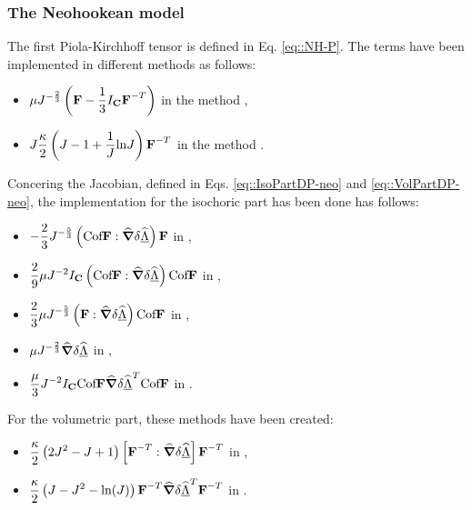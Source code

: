 \subsubsection{The Neohookean model}
The first Piola-Kirchhoff tensor is defined in Eq. \eqref{eq::NH-P}. The terms have been implemented in different methods as follows:
\begin{itemize}
  \item $\displaystyle \mu J^{-\frac{2}{3}}\left(\textbf{F}-\frac{1}{3}I_{\textbf{C}}\textbf{F}^{-T}\right)$ in the method ,
  \item $\displaystyle J\frac{\kappa}{2}\left(J-1+\frac{1}{J}\text{ln}J\right)\textbf{F}^{-T}$ in the method .
\end{itemize}
Concering the Jacobian, defined in Eqs. \eqref{eq::IsoPartDP-neo} and \eqref{eq::VolPartDP-neo}, the implementation for the isochoric part has been done has follows:
\begin{itemize}
  \item $\displaystyle -\frac{2}{3}J^{-\frac{5}{3}}\left(\text{Cof}\textbf{F}:\widehat{\boldsymbol{\nabla}}\delta\widehat{\underline{\Lambda}}\right)\textbf{F}$ in ,
  \item $\displaystyle \frac{2}{9}\mu J^{-2}I_{\textbf{C}}\left(\text{Cof}\textbf{F}:\widehat{\boldsymbol{\nabla}}\delta\widehat{\underline{\Lambda}}\right)\text{Cof}\textbf{F}$ in ,
  \item $\displaystyle \frac{2}{3}\mu J^{-\frac{5}{3}}\left(\textbf{F}:\widehat{\boldsymbol{\nabla}}\delta\widehat{\underline{\Lambda}}\right)\text{Cof}\textbf{F}$ in ,
  \item $\displaystyle \mu J^{-\frac{2}{3}}\widehat{\boldsymbol{\nabla}}\delta\widehat{\underline{\Lambda}}$ in ,
  \item $\displaystyle \frac{\mu}{3}J^{-2}I_{\textbf{C}}\text{Cof}\textbf{F}\widehat{\boldsymbol{\nabla}}\delta\widehat{\underline{\Lambda}}^T\text{Cof}\textbf{F}$ in .
\end{itemize}
For the volumetric part, these methods have been created:
\begin{itemize}
  \item $\displaystyle \frac{\kappa}{2}\left(2J^2-J+1\right)\left[\textbf{F}^{-T}:\widehat{\boldsymbol{\nabla}}\delta\widehat{\underline{\Lambda}}\right]\textbf{F}^{-T}$ in ,
  \item $\displaystyle \frac{\kappa}{2}\left(J-J^2-\text{ln}(J)\right)\textbf{F}^{-T}\widehat{\boldsymbol{\nabla}}\delta\widehat{\underline{\Lambda}}^T\textbf{F}^{-T}$ in .
\end{itemize}


